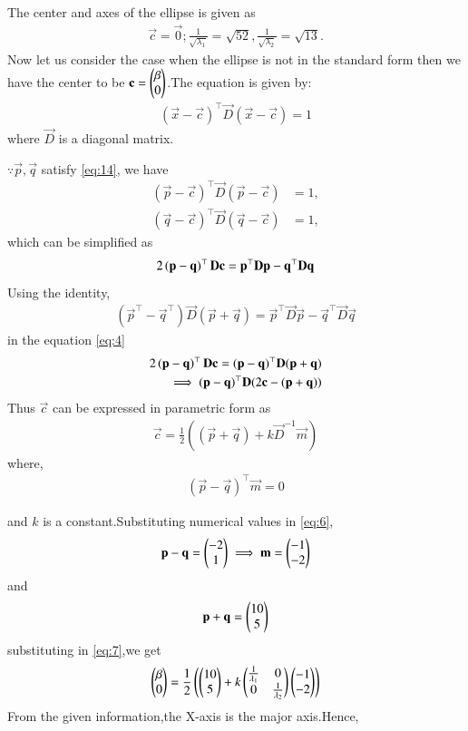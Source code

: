 \documentclass[journal,12pt,twocolumn]{IEEEtran}
\begin{document}
The center and axes of the ellipse is given as
\begin{align}
\vec{c} = \vec{0};
\frac{1}{\sqrt{\lambda_1}}  = \sqrt{52},
\frac{1}{\sqrt{\lambda_2}} =\sqrt{13}.
\end{align}
Now let us consider the case when the ellipse is not in the standard form then we have the center to be $\mathbf{c}=\begin{pmatrix}\beta\\0\end{pmatrix}$.The equation is given by:
\begin{align}
(\vec{x}-\vec{c})^{\top}\vec{D}(\vec{x}-\vec{c})=1\label{eq:14}
\end{align}
where $\vec{D}$ is a diagonal matrix.

$\because \vec{p}, \vec{q}$ satisfy \eqref{eq:14}, we have
\begin{align}
\label{eq:ellipse_std_ab}
(\vec{p}-\vec{c})^{\top}\vec{D}(\vec{p}-\vec{c}) &= 1,
\\
(\vec{q}-\vec{c})^{\top}\vec{D}(\vec{q}-\vec{c}) &= 1,
\end{align}
which can be simplified as
\begin{align}
    2\left(\mathbf{p}-\mathbf{q}\right)^{\top}\mathbf{D}\mathbf{c}=\mathbf{p}^{\top}\mathbf{D}\mathbf{p}-\mathbf{q}^{\top}\mathbf{D}\mathbf{q} \label{eq:4}
\end{align}
Using the identity,
\begin{align}
   (\vec{p}^{\top}-\vec{q}^{\top})\vec{D}(\vec{p}+\vec{q})
   =\vec{p}^{\top}\vec{D}\vec{p}-\vec{q}^{\top}\vec{D}\vec{q}
\end{align}
in the equation \eqref{eq:4}
\begin{align}
    2\left(\mathbf{p}-\mathbf{q}\right)^{\top}\mathbf{D}\mathbf{c}=(\mathbf{p}-\mathbf{q})^{\top}\mathbf{D}(\mathbf{p}+\mathbf{q})\\
    \implies (\mathbf{p}-\mathbf{q})^{\top}\mathbf{D}(2\mathbf{c}-(\mathbf{p}+\mathbf{q}))
\end{align}
Thus $\vec{c}$ can be expressed in parametric form as
\begin{align}
\vec{c}=\frac{1}{2}((\vec{p}+\vec{q})+k\vec{D}^{-1}\vec{m}) \label{eq:7}
\end{align}
where,
\begin{align}
    (\vec{p}-\vec{q})^{\top}\vec{m}=0 \label{eq:6}
\end{align}

and $k$ is a constant.Substituting numerical values in \eqref{eq:6}, \begin{align}
    \mathbf{p}-\mathbf{q} = \begin{pmatrix}-2 \\ 1\end{pmatrix} \implies \mathbf{m} = \begin{pmatrix}-1 \\ -2\end{pmatrix}
\end{align}
and
\begin{align}
    \mathbf{p}+\mathbf{q} = \begin{pmatrix}10 \\ 5\end{pmatrix}
\end{align}
substituting in \eqref{eq:7},we get
\begin{align}
 \begin{pmatrix}\beta\\0\end{pmatrix}=\frac{1}{2}\left(\begin{pmatrix}10 \\ 5\end{pmatrix} + k\begin{pmatrix}\frac{1}{\lambda_1}&0 \\ 0&\frac{1}{\lambda_2}\end{pmatrix}\begin{pmatrix}-1 \\ -2\end{pmatrix}\right)
\end{align}
From the given information,the X-axis is the major axis.Hence,
\end{document}
